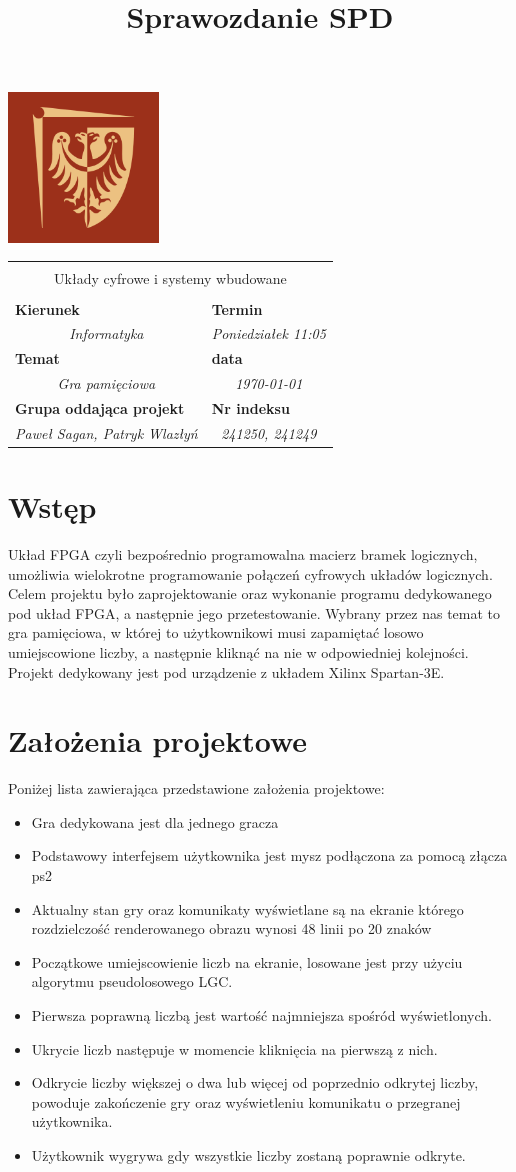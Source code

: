 \documentclass[polish,polish,a4paper]{article}
\title{Sprawozdanie SPD}
\newcommand{\name}[1]{\sffamily\bfseries\scriptsize #1}
\newcommand{\frontpage}[8]{

\hfill\includegraphics[width=4cm]{PWr.png}
\vspace{2cm}

\begin{tabular}{|p{0.72\textwidth}|p{0.28\textwidth}|}
\hline
\multicolumn{2}{|c|}{}\\
\multicolumn{2}{|c|}{{\LARGE #1}}\\
\multicolumn{2}{|c|}{}\\
\hline
\name{Kierunek} & \name{Termin}\\
\multicolumn{1}{|c|}{\textit{#2}} & \multicolumn{1}{|c|}{\textit{#3}} \\
\hline
\name{Temat} & \name{data}\\
\multicolumn{1}{|c|}{\textit{#4}} & \multicolumn{1}{|c|}{\textit{#5}} \\
\hline
\name{Grupa oddająca projekt} & \name{Nr indeksu}\\
\multicolumn{1}{|c|}{\textit{#6}} & \multicolumn{1}{|c|}{\textit{#7}} \\
\hline
\end{tabular}
}
\begin{document}
\frontpage{Układy cyfrowe i systemy wbudowane}{Informatyka}{Poniedziałek 11:05}{Gra pamięciowa}{\today}{Paweł Sagan, Patryk Wlazłyń}{241250, 241249}
\pagestyle{}
\newpage
\tableofcontents
\newpage
\section{Wstęp}
Układ FPGA czyli bezpośrednio programowalna macierz bramek logicznych, umożliwia wielokrotne programowanie połączeń cyfrowych układów logicznych. Celem projektu było zaprojektowanie oraz wykonanie programu dedykowanego pod układ FPGA, a następnie jego przetestowanie. Wybrany przez nas temat to gra pamięciowa, w której to użytkownikowi musi zapamiętać losowo umiejscowione liczby, a następnie kliknąć na nie w odpowiedniej kolejności. Projekt dedykowany jest pod urządzenie z układem Xilinx Spartan-3E.

\section{Założenia projektowe}
Poniżej lista zawierająca przedstawione założenia projektowe:
\begin{itemize}
  \item Gra dedykowana jest dla jednego gracza
  \item Podstawowy interfejsem użytkownika jest mysz podłączona za pomocą złącza ps2
  \item Aktualny stan gry oraz komunikaty wyświetlane są na ekranie którego rozdzielczość renderowanego obrazu wynosi 48 linii po 20 znaków
  \item Początkowe umiejscowienie liczb na ekranie, losowane jest przy użyciu algorytmu pseudolosowego LGC.
  \item Pierwsza poprawną liczbą jest wartość najmniejsza spośród wyświetlonych.
  \item Ukrycie liczb następuje w momencie kliknięcia na pierwszą z nich.
  \item Odkrycie liczby większej o dwa lub więcej od poprzednio odkrytej liczby, powoduje zakończenie gry oraz wyświetleniu komunikatu o przegranej użytkownika.
  \item Użytkownik wygrywa gdy wszystkie liczby zostaną poprawnie odkryte. 
\end{itemize}
\end{document}
